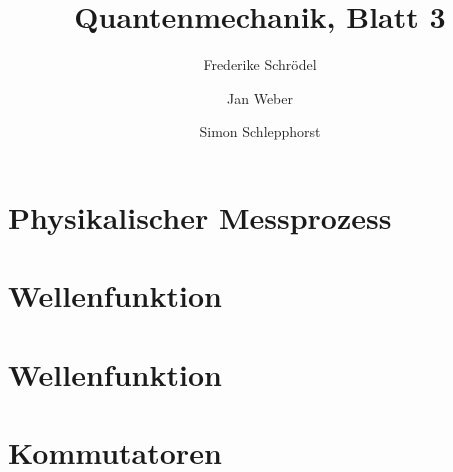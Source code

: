 \documentclass[11pt, ngerman, fleqn, DIV=15, headinclude]{scrartcl}
\title{Quantenmechanik, Blatt 3}
\author{
    Frederike Schrödel \and Jan Weber \and Simon Schlepphorst
}
\begin{document}
\maketitle

\section{Physikalischer Messprozess}

\section{Wellenfunktion}

\section{Wellenfunktion}

\section{Kommutatoren}
\end{document}
